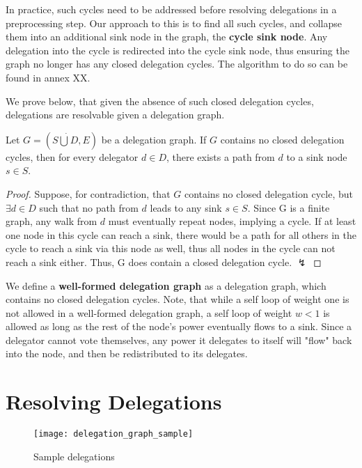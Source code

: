 In practice, such cycles need to be addressed before resolving delegations in a preprocessing step. Our approach to this is to find all such cycles, and collapse them into an additional sink node in the graph, the \textbf{cycle sink node}. Any delegation into the cycle is redirected into the cycle sink node,  thus ensuring the graph no longer has any closed delegation cycles. The algorithm to do so can be found in annex XX.  

We prove below, that given the absence of such closed delegation cycles, delegations are resolvable given a delegation graph. 

\begin{theorem}
Let $G = (S \dot\bigcup D, E)$ be a delegation graph. If $G$ contains no closed delegation cycles, then for every delegator $d \in D$, there exists a path from $d$ to a sink node $s \in S$.
\end{theorem}
\begin{proof}
Suppose, for contradiction, that $G$ contains no closed delegation cycle, but $\exists d \in D$ such that no path from $d$ leads to any sink $s \in S$. Since G is a finite graph, any walk from $d$ must eventually repeat nodes, implying a cycle. If at least one node in this cycle can reach a sink, there would be a path for all others in the cycle to reach a sink via this node as well, thus all nodes in the cycle can not reach a sink either. Thus, G does contain a closed delegation cycle. $\lightning$
\end{proof}

We define a \textbf{well-formed delegation graph} as a delegation graph, which contains no closed delegation cycles. Note, that while a self loop of weight one is not allowed in a well-formed delegation graph, a self loop of weight $w < 1$ is allowed as long as the rest of the node's power eventually flows to a sink. Since a delegator cannot vote themselves, any power it delegates to itself will "flow" back into the node, and then be redistributed to its delegates. 

\section{Resolving Delegations}
\label{sec:resolving_delegations}

\begin{figure}[t]
	\centering
	\texttt{[image: delegation\_graph\_sample]}
	\caption{Sample delegations}
	\label{fig:sample_delegations}
\end{figure}

